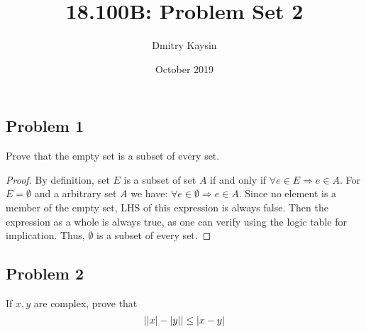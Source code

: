 \documentclass{article}
\title{18.100B: Problem Set 2}
\author{Dmitry Kaysin}
\date{October 2019}
\DeclarePairedDelimiter{\abs}{\lvert}{\rvert}
\begin{document}
\maketitle 


\subsection*{Problem 1}

\begin{tcolorbox}
Prove that the empty set is a subset of every set.
\end{tcolorbox}

\begin{proof}

By definition, set $E$ is a subset of set $A$ if and only if $\forall e \in E \Rightarrow e \in A$.
For $E = \emptyset$ and a arbitrary set $A$ we have: $\forall e \in \emptyset \Rightarrow e \in A$.
Since no element is a member of the empty set, LHS of this expression is always false.
Then the expression as a whole is always true, as one can verify using the logic table for implication.
Thus, $\emptyset$ is a subset of every set.

\end{proof}


\subsection*{Problem 2}

\begin{tcolorbox}
If $x, y$ are complex, prove that
\[ \abs{\abs{x} - \abs{y}} \leq \abs{x - y} \]
\end{tcolorbox}
\end{document}
